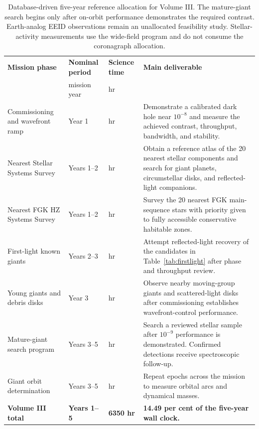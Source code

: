 \begin{table}[tp]
\centering
\sffamily\small
\begin{tabularx}{\textwidth}{@{}
  >{\raggedright\arraybackslash}p{3.5cm}
  >{\raggedright\arraybackslash}p{2.15cm}
  >{\raggedright\arraybackslash}p{2.4cm}
  >{\raggedright\arraybackslash}X@{}}
\toprule
\textbf{Mission phase} & \textbf{Nominal period} & \textbf{Science time} & \textbf{Main deliverable}\\
 & mission year & hr & \\
\midrule
Commissioning and wavefront ramp & Year 1 & 400 hr & Demonstrate a calibrated dark hole near $10^{-8}$ and measure the achieved contrast, throughput, bandwidth, and stability.\\
Nearest Stellar Systems Survey & Years 1--2 & 400 hr & Obtain a reference atlas of the 20 nearest stellar components and search for giant planets, circumstellar disks, and reflected-light companions.\\
Nearest FGK HZ Systems Survey & Years 1--2 & 2000 hr & Survey the 20 nearest FGK main-sequence stars with priority given to fully accessible conservative habitable zones.\\
First-light known giants & Years 2--3 & 400 hr & Attempt reflected-light recovery of the candidates in Table~\ref{tab:firstlight} after phase and throughput review.\\
Young giants and debris disks & Year 3 & 350 hr & Observe nearby moving-group giants and scattered-light disks after commissioning establishes wavefront-control performance.\\
Mature-giant search program & Years 3--5 & 2000 hr & Search a reviewed stellar sample after $10^{-9}$ performance is demonstrated. Confirmed detections receive spectroscopic follow-up.\\
Giant orbit determination & Years 3--5 & 800 hr & Repeat epochs across the mission to measure orbital arcs and dynamical masses.\\
\midrule
\textbf{Volume III total} & \textbf{Years 1--5} & \textbf{6350 hr} & \textbf{14.49 per cent of the five-year wall clock.}\\
\bottomrule
\end{tabularx}
\caption{Database-driven five-year reference allocation for Volume III. The
mature-giant search begins only after on-orbit performance demonstrates the
required contrast. Earth-analog EEID observations remain an unallocated
feasibility study. Stellar-activity measurements use the wide-field program
and do not consume the coronagraph allocation.}
\label{tab:exotimeline}
\end{table}

